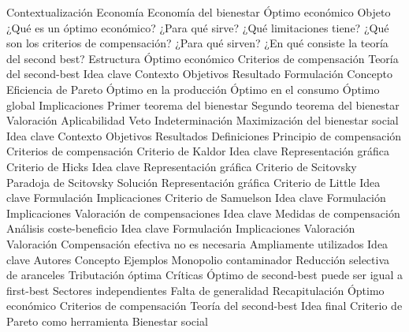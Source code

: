\documentclass{nuevotema}
\begin{document}
\esquemacorto

\begin{esquema}[enumerate]
	\1[] 
		\2 Contextualización
			\3 Economía
			\3 Economía del bienestar
			\3 Óptimo económico
		\2 Objeto
			\3 ¿Qué es un óptimo económico?
			\3 ¿Para qué sirve?
			\3 ¿Qué limitaciones tiene?
			\3 ¿Qué son los criterios de compensación?
			\3 ¿Para qué sirven?
			\3 ¿En qué consiste la teoría del second best?
		\2 Estructura
			\3 Óptimo económico
			\3 Criterios de compensación
			\3 Teoría del second-best
	\1 
		\2 Idea clave
			\3 Contexto
			\3 Objetivos
			\3 Resultado
		\2 Formulación
			\3 Concepto
			\3 Eficiencia de Pareto
			\3 Óptimo en la producción
			\3 Óptimo en el consumo
			\3 Óptimo global
		\2 Implicaciones
			\3 Primer teorema del bienestar
			\3 Segundo teorema del bienestar
		\2 Valoración
			\3 Aplicabilidad
			\3 Veto
			\3 Indeterminación
			\3 Maximización del bienestar social
	\1 
		\2 Idea clave
			\3 Contexto
			\3 Objetivos
			\3 Resultados
		\2 Definiciones
			\3 Principio de compensación
			\3 Criterios de compensación
		\2 Criterio de Kaldor
			\3 Idea clave
			\3 Representación gráfica
		\2 Criterio de Hicks
			\3 Idea clave
			\3 Representación gráfica
		\2 Criterio de Scitovsky
			\3 Paradoja de Scitovsky
			\3 Solución
			\3 Representación gráfica
		\2 Criterio de Little
			\3 Idea clave
			\3 Formulación
			\3 Implicaciones
		\2 Criterio de Samuelson
			\3 Idea clave
			\3 Formulación
			\3 Implicaciones
		\2 Valoración de compensaciones
			\3 Idea clave
			\3 Medidas de compensación
		\2 Análisis coste-beneficio
			\3 Idea clave
			\3 Formulación
			\3 Implicaciones
			\3 Valoración
		\2 Valoración
			\3 Compensación efectiva no es necesaria
			\3 Ampliamente utilizados
	\1 
		\2 Idea clave
			\3 Autores
			\3 Concepto
		\2 Ejemplos
			\3 Monopolio contaminador
			\3 Reducción selectiva de aranceles
			\3 Tributación óptima
		\2 Críticas
			\3 Óptimo de second-best puede ser igual a first-best
			\3 Sectores independientes
			\3 Falta de generalidad
	\1[] 
		\2 Recapitulación
			\3 Óptimo económico
			\3 Criterios de compensación
			\3 Teoría del second-best
		\2 Idea final
			\3 Criterio de Pareto como herramienta
			\3 Bienestar social

\end{esquema}

\esquemalargo
\end{document}
